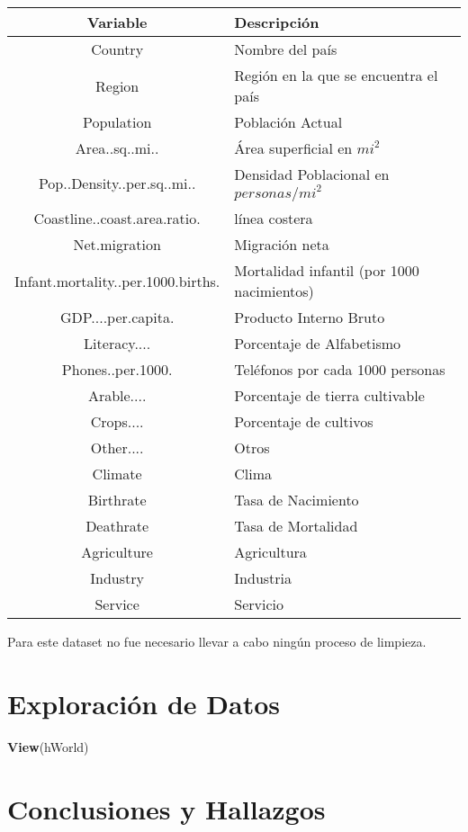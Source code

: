 \documentclass[]{article}
\newenvironment{Shaded}{\begin{snugshade}}{\end{snugshade}}
\newcommand{\KeywordTok}[1]{\textcolor[rgb]{0.13,0.29,0.53}{\textbf{#1}}}
\newcommand{\NormalTok}[1]{#1}
\begin{document}
\begin{center}
\begin{tabularx}{\linewidth}{ |c|X|} 
 \hline
 \textbf{Variable} & \textbf{Descripción}\\
 \hline
 Country & Nombre del país\\
 \hline
 Region & Región en la que se encuentra el país\\
 \hline
 Population & Población Actual \\
 \hline
 Area..sq..mi.. & Área superficial en $mi^2$ \\
 \hline
 Pop..Density..per.sq..mi.. & Densidad Poblacional en $personas/mi^2$ \\
 \hline
 Coastline..coast.area.ratio. & línea costera \\
 \hline
  Net.migration & Migración neta \\
 \hline
 Infant.mortality..per.1000.births. & Mortalidad infantil (por 1000 nacimientos)\\
 \hline
 GDP....per.capita. & Producto Interno Bruto \\
 \hline
 Literacy.... & Porcentaje de Alfabetismo \\
 \hline
 Phones..per.1000. & Teléfonos por cada 1000 personas \\
 \hline
 Arable.... & Porcentaje de tierra cultivable \\
 \hline
 Crops.... & Porcentaje de cultivos \\
 \hline
 Other.... & Otros \\
 \hline
 Climate & Clima\\
 \hline
 Birthrate & Tasa de Nacimiento\\
 \hline
 Deathrate & Tasa de Mortalidad \\
 \hline
 Agriculture & Agricultura \\
 \hline
 Industry & Industria \\
 \hline
 Service & Servicio \\
 \hline
 \hline
\end{tabularx}
\end{center}

Para este dataset no fue necesario llevar a cabo ningún proceso de
limpieza.

\section{Exploración de Datos}\label{exploracion-de-datos}

\begin{Shaded}
\begin{Highlighting}[]
\KeywordTok{View}\NormalTok{(hWorld)}
\end{Highlighting}
\end{Shaded}

\section{Conclusiones y Hallazgos}\label{conclusiones-y-hallazgos}
\end{document}
